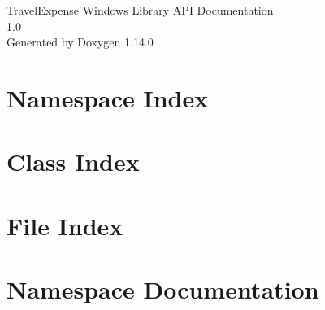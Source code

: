 \documentclass[twoside]{book}
\newcommand{\+}{\discretionary{\mbox{\scriptsize$\hookleftarrow$}}{}{}}
\newcommand{\clearemptydoublepage}{%
    \newpage{\pagestyle{empty}\cleardoublepage}%
  }
\begin{document}
  \raggedbottom
    \hypersetup{pageanchor=false,
                bookmarksnumbered=true,
                pdfencoding=unicode
               }
  \begin{titlepage}
  \vspace*{7cm}
  \begin{center}%
  {\Large Travel\+Expense Windows Library API Documentation}\\
  [1ex]\large 1.\+0 \\
  \vspace*{1cm}
  {\large Generated by Doxygen 1.14.0}\\
  \end{center}
  \end{titlepage}
  \clearemptydoublepage
  \tableofcontents
  \clearemptydoublepage
  \hypersetup{pageanchor=true}

\chapter{Namespace Index}

\chapter{Class Index}

\chapter{File Index}

\chapter{Namespace Documentation}





































\end{document}
